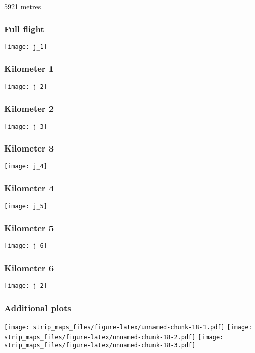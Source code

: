 \documentclass[]{article}
\begin{document}
5921 metres

\subsubsection{Full flight}\label{full-flight-9}

\texttt{[image: j\_1]}

\subsubsection{Kilometer 1}\label{kilometer-1-9}

\texttt{[image: j\_2]}

\subsubsection{Kilometer 2}\label{kilometer-2-9}

\texttt{[image: j\_3]}

\subsubsection{Kilometer 3}\label{kilometer-3-9}

\texttt{[image: j\_4]}

\subsubsection{Kilometer 4}\label{kilometer-4-9}

\texttt{[image: j\_5]}

\subsubsection{Kilometer 5}\label{kilometer-5-9}

\texttt{[image: j\_6]}

\subsubsection{Kilometer 6}\label{kilometer-6-6}

\texttt{[image: j\_2]}

\subsubsection{Additional plots}\label{additional-plots-9}

\texttt{[image: strip\_maps\_files/figure-latex/unnamed-chunk-18-1.pdf]}
\texttt{[image: strip\_maps\_files/figure-latex/unnamed-chunk-18-2.pdf]}
\texttt{[image: strip\_maps\_files/figure-latex/unnamed-chunk-18-3.pdf]}
\end{document}
